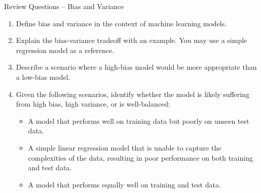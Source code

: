 \documentclass[ignorenonframetext,xcolor=x11names]{beamer}
\begin{document}

\begin{frame}{Review Questions -- Bias and Variance}
\begin{enumerate}
  \item Define bias and variance in the context of machine learning models.
  \item Explain the bias-variance tradeoff with an example. You may use a simple regression model as a reference.
  \item Describe a scenario where a high-bias model would be more appropriate than a low-bias model.
  \item Given the following scenarios, identify whether the model is likely suffering from high bias, high variance, or is well-balanced:
	\begin{itemize}
	  \item A model that performs well on training data but poorly on unseen test data.
	  \item A simple linear regression model that is unable to capture the complexities of the data, resulting in poor performance on both training and test data.
	  \item A model that performs equally well on training and test data.
	\end{itemize}
\end{enumerate}
\end{frame}
\end{document}
